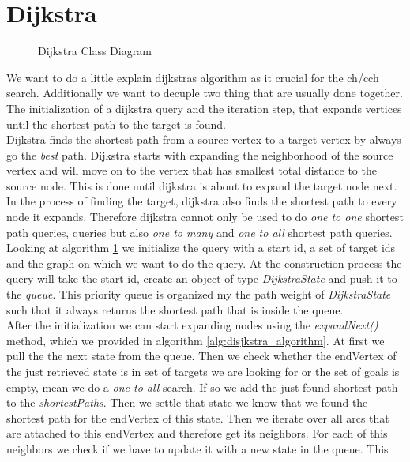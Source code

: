 \section{Dijkstra} \label{sec:dijkstra}

\begin{figure}
    \centering
    
    \caption{Dijkstra Class Diagram}
    \label{fig:dijkstra_class}
\end{figure}

We want to do a little explain dijkstras algorithm as it crucial for the ch/cch search. Additionally we want to decuple two thing that are usually done together.
The initialization of a dijkstra query and the iteration step, that expands vertices until the shortest path to the target is found. 
\\ 
Dijkstra finds the shortest path from a source vertex to a target vertex by always go the \textit{best} path. Dijkstra starts with expanding the neighborhood of
the source vertex and will move on to the vertex that has smallest total distance to the source node. This is done until dijkstra is about to expand the target node next.
In the process of finding the target, dijkstra also finds the shortest path to every node it expands. Therefore dijkstra cannot only be used to do \textit{one to one} shortest path queries,
queries but also \textit{one to many} and \textit{one to all} shortest path queries.
\\
Looking at algorithm \ref{fig:dijkstra_class} we initialize the query with a start id, a set of target ids and the graph on which we want to do the query. At the construction
process the query will take the start id, create an object of type \textit{DijkstraState} and push it to the \textit{queue}. This priority queue is organized my the path weight of 
\textit{DijkstraState} such that it always returns the shortest path that is inside the queue.
\\
After the initialization we can start expanding nodes using the \textit{expandNext()} method, which we provided in algorithm \ref{alg:disjkstra_algorithm}. At first we pull the 
the next state from the queue. Then we check whether the endVertex of the just retrieved state is in set of targets we are looking for or the set of goals is empty, mean we do a \textit{one to all} search.
If so we add the just found shortest path to the \textit{shortestPaths}. Then we settle that state we know that we found the shortest path for the endVertex of this state. Then we 
iterate over all arcs that are attached to this endVertex and therefore get its neighbors. For each of this neighbors we check if we have to update it with a new state in the queue. This
